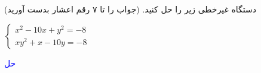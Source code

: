 دستگاه غیرخطی زیر را حل کنید. (جواب را تا ۷ رقم اعشار بدست آورید)

\begin{center}
$
    \begin{cases}
    x^2 - 10x + y^2 = -8 \\
    xy^2 + x - 10y = -8
    \end{cases}
$
\end{center}

\textcolor{blue}{
حل
\\

}